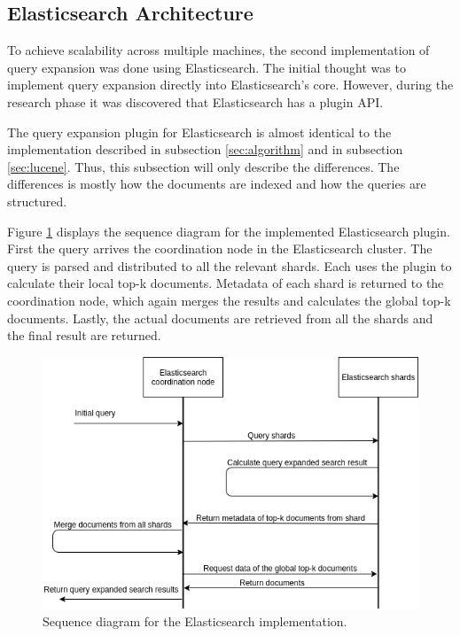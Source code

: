 \subsection{Elasticsearch Architecture}
To achieve scalability across multiple machines,
the second implementation of query expansion was done using Elasticsearch.
The initial thought was to implement query expansion directly into Elasticsearch's core.
However, during the research phase it was discovered that Elasticsearch has a plugin API.

The query expansion plugin for Elasticsearch is almost identical to the implementation described in subsection \ref{sec:algorithm} and in subsection \ref{sec:lucene}.
Thus, this subsection will only describe the differences.
The differences is mostly how the documents are indexed and how the queries are structured.

Figure \ref{fig:sequence-diagram-elasticsearch} displays the sequence diagram for the implemented Elasticsearch plugin.
First the query arrives the coordination node in the Elasticsearch cluster.
The query is parsed and distributed to all the relevant shards.
Each uses the plugin to calculate their local top-k documents.
Metadata of each shard is returned to the coordination node,
which again merges the results and calculates the global top-k documents.
Lastly,
the actual documents are retrieved from all the shards and the final result are returned.

\begin{figure}[h!]
  \centering \includegraphics[width=1\linewidth]{img/sequence-diagram-elasticsearch.png}
  \caption{Sequence diagram for the Elasticsearch implementation.}
  \label{fig:sequence-diagram-elasticsearch}
\end{figure}

